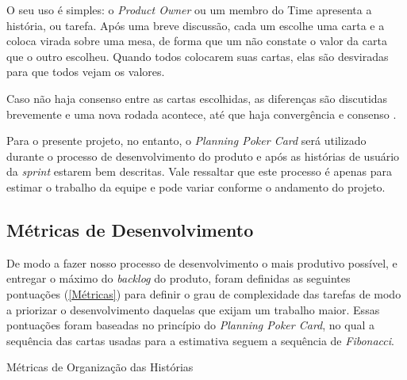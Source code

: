 \begin{citacao}
O seu uso é simples: o \textsl{Product Owner} ou um membro do Time apresenta a história, ou tarefa. Após uma breve discussão, cada um escolhe uma carta e a coloca virada sobre uma mesa, de forma que um não constate o valor da carta que o outro escolheu. Quando todos colocarem suas cartas, elas são desviradas para que todos vejam os valores.

Caso não haja consenso entre as cartas escolhidas, as diferenças são discutidas brevemente e uma nova rodada acontece, até que haja convergência e consenso \cite{cruz:2018}.
\end{citacao}

Para o presente projeto, no entanto, o \textsl{Planning Poker Card} será utilizado durante o processo de desenvolvimento do produto e após as histórias de usuário da \textsl{sprint} estarem bem descritas. Vale ressaltar que este processo é apenas para estimar o trabalho da equipe e pode variar conforme o andamento do projeto.

\subsection{Métricas de Desenvolvimento}
De modo a fazer nosso processo de desenvolvimento o mais produtivo possível, e entregar o máximo do \textit{backlog} do produto, foram definidas as seguintes pontuações (\autoref{Métricas}) para definir o grau de complexidade das tarefas de modo a priorizar o desenvolvimento daquelas que exijam um trabalho maior. Essas pontuações foram baseadas no princípio do \textit{Planning Poker Card}, no qual a sequência das cartas usadas para a estimativa seguem a sequência de \textit{Fibonacci}. 

\def\arraystretch{2}
\begin{quadro}[htb]
\centering
\ABNTEXfontereduzida
\caption{Métricas de Organização das Histórias}
\label{Métricas}
\end{quadro}
\FloatBarrier

